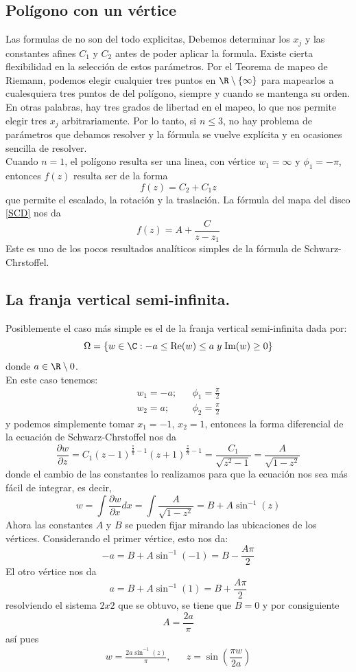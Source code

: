 	\subsection{Polígono con un vértice}
	Las formulas de \SC no son del todo explicitas, Debemos determinar los $x_j$ y las constantes afines $C_1$ y $C_2$ antes de poder aplicar la formula. Existe cierta flexibilidad en la selección de estos parámetros. Por el Teorema de mapeo de Riemann, podemos elegir cualquier tres puntos en $\R\setminus\{\infty\}$ para mapearlos a cualesquiera tres puntos de del polígono, siempre y cuando se mantenga su orden. En otras palabras, hay tres grados de libertad en el mapeo, lo que nos permite elegir tres  $x_j$ arbitrariamente. Por lo tanto, si $n \leq 3$, no hay problema de parámetros que debamos resolver y la fórmula \SC se vuelve explícita y en ocasiones sencilla de resolver.\\
	Cuando $n=1$, el polígono resulta ser una linea, con vértice  $w_1=\infty$ y $\phi_1=-\pi$, entonces $f(z)$ resulta ser de la forma
	$$f(z)=C_2+C_1z$$
	que permite el escalado, la rotación y la traslación. La fórmula del mapa del disco  \ref{SCD} nos da 
	$$f(z)=A+\dfrac{C}{z-z_1}$$
			Este es uno de los pocos resultados analíticos simples de la fórmula de Schwarz-Chrstoffel. 




	\subsection{La franja vertical semi-infinita.}
		Posiblemente el caso más simple es el de la franja vertical semi-infinita dada por:
		$$\Omega=\{ w\in \C : -a\leq \mbox{Re}(w)\leq a\; y \; \mbox{Im}(w)\geq 0  \}$$
		donde $a\in\R\setminus{0}$.\\
		En este caso tenemos:
		\[
			\begin{array}{lcr}
				w_1=-a;&&\phi_1=\frac{\pi}{2}\\
				w_2=a;&&\phi_2=\frac{\pi}{2}
			\end{array}
		\]
		y podemos simplemente tomar $x_1=-1$, $x_2=1$, entonces la forma diferencial de la ecuación de Schwarz-Chrstoffel nos da
		$$\frac{\partial w}{\partial z}=C_1(z-1)^{\frac{\frac{\pi}{2}}{\pi}-1}(z+1)^{\frac{\frac{\pi}{2}}{\pi}-1}=\dfrac{C_1}{\sqrt{z^2-1}}=\dfrac{A}{\sqrt{1-z^2}}$$
		donde el cambio de las constantes lo realizamos para que la ecuación nos sea más fácil de integrar, es decir,
		\[
			w=\int \frac{\partial w}{\partial x}dx=\int \dfrac{A}{\sqrt{1-z^2}}=B+A\sin^{-1}(z)
		\]
		Ahora las constantes $A$ y $B$ se pueden fijar mirando las ubicaciones de los vértices. Considerando el primer vértice, esto nos da:
		$$-a=B+A\sin^{-1}(-1)=B-\frac{A\pi}{2}$$
		El otro vértice nos da
		$$a=B+A\sin^{-1}(1)=B+\frac{A\pi}{2}$$
		resolviendo el sistema $2x2$ que se obtuvo, se tiene que $B=0$ y por consiguiente $$A=\frac{2a}{\pi}$$
		 así pues 
		\[
			\begin{array}{lcr}
				w=\frac{2a\sin^{-1}(z)}{\pi},&&z=\sin\left(\dfrac{\pi w}{2a}\right)
			\end{array}
		\]

